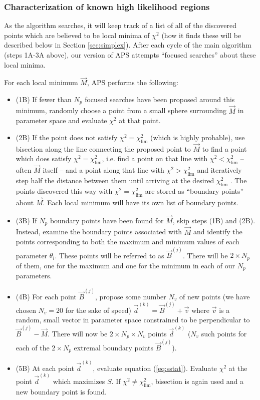 \documentclass[useAMS,usenatbib]{aastex}
\begin{document}
\subsubsection{Characterization of known high likelihood regions}
\label{sec:focus}

As the algorithm searches, it will keep track of a list of all of the discovered points
which are believed to be local minima of $\chi^2$ (how it finds these will be described below
in Section \ref{sec:simplex}).  After each cycle of the main algorithm (steps 1A-3A above),
our version of APS attempts ``focused searches'' about these local minima.  

For each local minimum $\vec{M}$, APS performs the following:
\begin{itemize}
\item (1B) If fewer than $N_p$ focused searches have been proposed around this minimum, randomly
choose a point from a small sphere surrounding $\vec{M}$ in parameter space and 
evaluate $\chi^2$ at that point.  
\\
\item(2B) If the point does not satisfy $\chi^2=\chi^2_\text{lim}$ (which is highly probable), 
use bisection
along the line connecting the proposed point to $\vec{M}$ to find a point which does
satisfy $\chi^2=\chi^2_\text{lim}$, i.e. find a point on that line with
$\chi^2<\chi^2_\text{lim}$ -- often $\vec{M}$ itself -- and a point along that line
with $\chi^2>\chi^2_\text{lim}$ and iteratively step half the distance between them until
arriving at the desired $\chi^2_\text{lim}$ \cite{minuit}.  The points discovered this way with
$\chi^2=\chi^2_\text{lim}$ are stored as ``boundary points'' about $\vec{M}$.  Each local
minimum will have its own list of boundary points.
\\
\item(3B) If $N_p$ boundary points have been found for $\vec{M}$, skip steps (1B) and (2B).
Instead, examine the boundary points associated with $\vec{M}$ and identify the points
corresponding to both the maximum and minimum values of each parameter $\theta_i$.  These
points will be referred to as $\vec{B}^{(j)}$.  There will be $2\times N_p$ of them, one for
the maximum and one for the minimum in each of our $N_p$ parameters.  
\\
\item(4B) For each point
$\vec{B}^{(j)}$, propose some number $N_v$ of new points (we have chosen
$N_v=20$ for the sake of speed) $\vec{d}^{(k)} = \vec{B}^{(j)}+\vec{v}$ where $\vec{v}$ is a
random, small vector in parameter space constrained to be perpendicular to
$\vec{B}^{(j)}-\vec{M}$.  There will now be $2\times N_p \times N_v$ points $\vec{d}^{(k)}$
($N_v$ such points for each of the $2\times N_p$ extremal boundary points $\vec{B}^{(j)}$).
\\
\item(5B) At each point $\vec{d}^{(k)}$, evaluate equation (\ref{eq:sstat}).  Evaluate $\chi^2$
at the point $\vec{d}^{(k)}$ which maximizes $S$. If
$\chi^2 \neq \chi^2_\text{lim}$, bisection is again used and a new boundary point is found.
\end{itemize}
\end{document}
